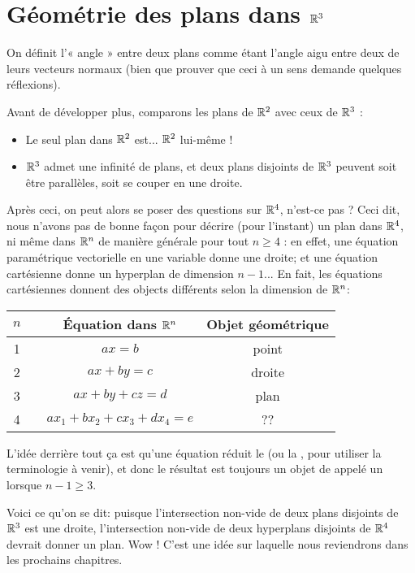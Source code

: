 \section{Géométrie des plans dans \texorpdfstring{$\mathbb{R}^3$}{R3}}

On définit l'« angle » entre deux plans comme étant l'angle aigu entre deux de leurs vecteurs normaux  
(bien que prouver que ceci à un sens demande quelques réflexions).

Avant de développer plus, comparons les plans de $\mathbb{R}^2$ avec ceux de $\mathbb{R}^3$ :
 
\begin{itemize}
	\item Le seul plan dans $\mathbb{R}^2$ est... $\mathbb{R}^2$ lui-même !

	\item $\mathbb{R}^3$ admet une infinité de plans, et deux plans disjoints de $\mathbb{R}^3$ peuvent soit être parallèles, soit se couper en une droite.
\end{itemize}

Après ceci, on peut alors se poser des questions sur $\mathbb{R}^4$, n'est-ce pas ?
Ceci dit, nous n'avons pas de bonne façon pour décrire (pour l'instant) un plan dans ${\mathbb{R}^4}$, ni même dans $\mathbb{R}^n$ de manière générale pour tout $n\geq 4$ :
en effet, une équation paramétrique vectorielle en une variable donne une droite; et une équation cartésienne donne un hyperplan de dimension $n-1$...  En fait, les équations cartésiennes donnent des objects différents selon la dimension de $\mathbb{R}^n$:

\begin{center}
\begin{tabular}{cccc}
$n$ & & \'Equation dans $\mathbb{R}^n$& Objet géométrique \\ 
\hline
1 &\hphantom{XX} & $ax=b$ & point \\
2 & & $ax+by=c$ & droite \\
3 & & $ax+by+cz =d$ & plan\\
4 & & $ax_1+bx_2+cx_3+dx_4=e$ & ??
\end{tabular}
\end{center}

L'idée derrière tout ça est qu'une équation réduit le 
(ou la , pour utiliser la terminologie \`a venir), et donc le résultat est toujours un objet
de  appelé un  lorsque $n-1\geq3$.

Voici ce qu'on se dit:  puisque l'intersection non-vide de deux plans disjoints de ${\mathbb{R}^3}$ est une droite, l'intersection non-vide de deux hyperplans disjoints de $\mathbb{R}^4$ devrait donner un plan. Wow !
C'est une idée sur laquelle nous reviendrons dans les prochains chapitres.

